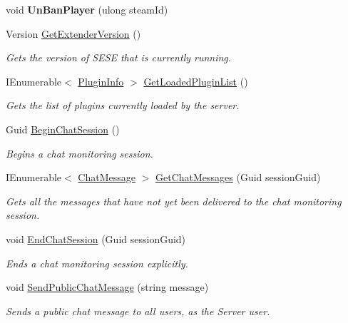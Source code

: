 \begin{DoxyCompactItemize}
\item 
\hypertarget{class_s_e_server_extender_1_1_server_service_1_1_server_service_ae964ae5c3961d8df12f8842738646064}{}void {\bfseries Un\+Ban\+Player} (ulong steam\+Id)\label{class_s_e_server_extender_1_1_server_service_1_1_server_service_ae964ae5c3961d8df12f8842738646064}

\item 
Version \hyperlink{class_s_e_server_extender_1_1_server_service_1_1_server_service_aa6d19ffd61bdbdfa66e140e5b877d56e}{Get\+Extender\+Version} ()
\begin{DoxyCompactList}\small\item\em Gets the version of S\+E\+S\+E that is currently running. \end{DoxyCompactList}\item 
I\+Enumerable$<$ \hyperlink{class_s_e_comm_1_1_plugins_1_1_plugin_info}{Plugin\+Info} $>$ \hyperlink{class_s_e_server_extender_1_1_server_service_1_1_server_service_ae5fb06c94f75d7cf1f87a39ffa1024de}{Get\+Loaded\+Plugin\+List} ()
\begin{DoxyCompactList}\small\item\em Gets the list of plugins currently loaded by the server. \end{DoxyCompactList}\item 
Guid \hyperlink{class_s_e_server_extender_1_1_server_service_1_1_server_service_afe7ef92d2bb28d88f0483886be990e41}{Begin\+Chat\+Session} ()
\begin{DoxyCompactList}\small\item\em Begins a chat monitoring session. \end{DoxyCompactList}\item 
I\+Enumerable$<$ \hyperlink{class_s_e_mod_a_p_i_internal_1_1_a_p_i_1_1_chat_1_1_chat_message}{Chat\+Message} $>$ \hyperlink{class_s_e_server_extender_1_1_server_service_1_1_server_service_ae144f3cb0cccb40c6c59e80041ae7e77}{Get\+Chat\+Messages} (Guid session\+Guid)
\begin{DoxyCompactList}\small\item\em Gets all the messages that have not yet been delivered to the chat monitoring session. \end{DoxyCompactList}\item 
void \hyperlink{class_s_e_server_extender_1_1_server_service_1_1_server_service_aa783734e6fcbab8ab0b0cdb985d01407}{End\+Chat\+Session} (Guid session\+Guid)
\begin{DoxyCompactList}\small\item\em Ends a chat monitoring session explicitly. \end{DoxyCompactList}\item 
void \hyperlink{class_s_e_server_extender_1_1_server_service_1_1_server_service_a027df7d9b658ca67735f462dac4f5e7d}{Send\+Public\+Chat\+Message} (string message)
\begin{DoxyCompactList}\small\item\em Sends a public chat message to all users, as the Server user. \end{DoxyCompactList}\end{DoxyCompactItemize}


